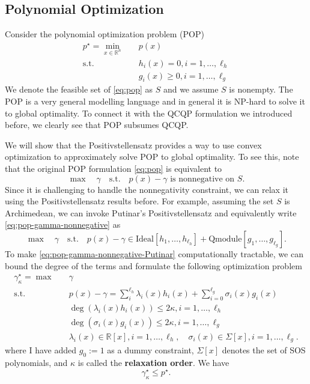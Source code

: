 \documentclass[
]{book}
\theoremstyle{definition}
\theoremstyle{definition}
\theoremstyle{definition}
\theoremstyle{definition}
\theoremstyle{remark}
\begin{document}
\subsection{Polynomial Optimization}\label{polynomial-optimization}

Consider the polynomial optimization problem (POP)
\begin{equation}
\begin{split}
p^\star = \min_{x \in \mathbb{R}^{n}} & \quad p(x) \\
\mathrm{s.t.}& \quad h_i(x) = 0, i=1,\dots,\ell_h \\
& \quad g_i(x) \geq 0, i=1,\dots,\ell_g
\end{split}
\label{eq:pop}
\end{equation}
We denote the feasible set of \eqref{eq:pop} as \(S\) and we assume \(S\) is nonempty. The POP is a very general modelling language and in general it is NP-hard to solve it to global optimality. To connect it with the QCQP formulation we introduced before, we clearly see that POP subsumes QCQP.

We will show that the Positivstellensatz provides a way to use convex optimization to approximately solve POP to global optimality. To see this, note that the original POP formulation \eqref{eq:pop} is equivalent to
\begin{equation}
\max \quad \gamma \quad \mathrm{s.t.}\quad p(x) - \gamma \text{ is nonnegative on } S. 
\label{eq:pop-gamma-nonnegative}
\end{equation}
Since it is challenging to handle the nonnegativity constraint, we can relax it using the Positivstellensatz results before. For example, assuming the set \(S\) is Archimedean, we can invoke Putinar's Positivstellensatz and equivalently write \eqref{eq:pop-gamma-nonnegative} as
\begin{equation}
\max \quad \gamma \quad \mathrm{s.t.}\quad p(x) - \gamma \in \mathrm{Ideal}[h_1,\dots,h_{\ell_h}] + \mathrm{Qmodule}[g_1,\dots,g_{\ell_g}]. 
\label{eq:pop-gamma-nonnegative-Putinar}
\end{equation}
To make \eqref{eq:pop-gamma-nonnegative-Putinar} computationally tractable, we can bound the degree of the terms and formulate the following optimization problem
\begin{equation}
\begin{split}
\gamma^\star_{\kappa}=\max & \quad \gamma\\
\mathrm{s.t.}& \quad p(x) - \gamma = \sum_{i}^{\ell_h} \lambda_i(x) h_i(x) + \sum_{i=0}^{\ell_g} \sigma_i(x) g_i(x) \\
& \quad \deg(\lambda_i(x) h_i(x)) \leq 2\kappa, i=1,\dots,\ell_h \\
& \quad \deg(\sigma_i(x) g_i(x)) \leq 2\kappa, i=1,\dots,\ell_g \\
& \quad \lambda_i(x) \in \mathbb{R}[x], i=1,\dots,\ell_h, \quad \sigma_i(x) \in \Sigma[x], i=1,\dots,\ell_g.
\end{split}
\label{eq:pop-gamma-nonnegative-Putinar-bound}
\end{equation}
where I have added \(g_0:=1\) as a dummy constraint, \(\Sigma[x]\) denotes the set of SOS polynomials, and \(\kappa\) is called the \textbf{relaxation order}. We have
\[
\gamma^\star_{\kappa} \leq p^\star.
\]
\end{document}
